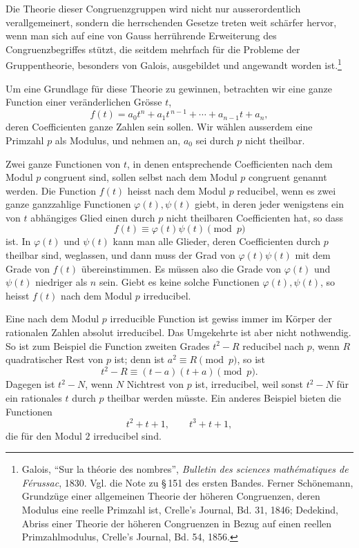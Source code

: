 \documentclass[11pt]{article}
\begin{document}
Die Theorie dieser Congruenzgruppen wird nicht nur ausserordentlich verallgemeinert, sondern die herrschenden Gesetze treten weit schärfer hervor, wenn man sich auf eine von Gauss herrührende Erweiterung des Congruenzbegriffes stützt, die seitdem mehrfach für die Probleme der Gruppentheorie, besonders von Galois, ausgebildet und angewandt worden ist.\footnote{Galois, ``Sur la théorie des nombres'', \emph{Bulletin des sciences mathématiques de Férussac}, 1830. Vgl. die Note zu \S\,151 des ersten Bandes. Ferner Schönemann, Grundzüge einer allgemeinen Theorie der höheren Congruenzen, deren Modulus eine reelle Primzahl ist, Crelle's Journal, Bd. 31, 1846; Dedekind, Abriss einer Theorie der höheren Congruenzen in Bezug auf einen reellen Primzahlmodulus, Crelle's Journal, Bd. 54, 1856.}

Um eine Grundlage für diese Theorie zu gewinnen, betrachten wir eine ganze Function einer veränderlichen Grösse $t$,
\begin{equation}
 f(t)=a_0t^n+a_1t^{\,n-1}+\cdots+a_{n-1}t+a_n, \tag{1}
\end{equation}
deren Coefficienten ganze Zahlen sein sollen. Wir wählen ausserdem eine Primzahl $p$ als Modulus, und nehmen an, $a_0$ sei durch $p$ nicht theilbar.

Zwei ganze Functionen von $t$, in denen entsprechende Coefficienten nach dem Modul $p$ congruent sind, sollen selbst nach dem Modul $p$ congruent genannt werden. Die Function $f(t)$ heisst nach dem Modul $p$ reducibel, wenn es zwei ganze ganzzahlige Functionen $\varphi(t),\psi(t)$ giebt, in deren jeder wenigstens ein von $t$ abhängiges Glied einen durch $p$ nicht theilbaren Coefficienten hat, so dass
\begin{equation}
 f(t)\equiv\varphi(t)\psi(t)\pmod p \tag{2}
\end{equation}
ist. In $\varphi(t)$ und $\psi(t)$ kann man alle Glieder, deren Coefficienten durch $p$ theilbar sind, weglassen, und dann muss der Grad von $\varphi(t)\psi(t)$ mit dem Grade von $f(t)$ übereinstimmen. Es müssen also die Grade von $\varphi(t)$ und $\psi(t)$ niedriger als $n$ sein. Giebt es keine solche Functionen $\varphi(t),\psi(t)$, so heisst $f(t)$ nach dem Modul $p$ irreducibel.

Eine nach dem Modul $p$ irreducible Function ist gewiss immer im Körper der rationalen Zahlen absolut irreducibel. Das Umgekehrte ist aber nicht nothwendig. So ist zum Beispiel die Function zweiten Grades $t^2-R$ reducibel nach $p$, wenn $R$ quadratischer Rest von $p$ ist; denn ist $a^2\equiv R\pmod p$, so ist
\[
 t^2-R\equiv(t-a)(t+a)\pmod p.
\]
Dagegen ist $t^2-N$, wenn $N$ Nichtrest von $p$ ist, irreducibel, weil sonst $t^2-N$ für ein rationales $t$ durch $p$ theilbar werden müsste. Ein anderes Beispiel bieten die Functionen
\[
 t^2+t+1,\qquad t^3+t+1,
\]
die für den Modul $2$ irreducibel sind.
\end{document}
